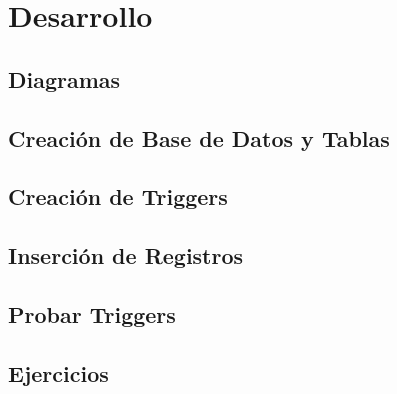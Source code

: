 \documentclass{extbook}
\begin{document}

\tableofcontents
\listoffigures
\chapter{Desarrollo}
\section{Diagramas}

\section{Creación de Base de Datos y Tablas}

\section{Creación de Triggers}

\section{Inserción de Registros}

\section{Probar Triggers}

\section{Ejercicios}

\end{document}
